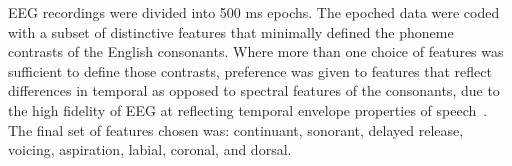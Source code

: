 EEG recordings were divided into 500 ms epochs.
The epoched data were coded with a subset of distinctive features
that minimally defined the phoneme contrasts of the English consonants.
Where more than one choice of features was sufficient to define those
contrasts, preference was given to features that reflect differences
in temporal as opposed to spectral features of the consonants, due to
the high fidelity of EEG at reflecting temporal envelope properties of 
speech~\cite{Liberto15}. The final set of features chosen was:
continuant, sonorant, delayed release, voicing, aspiration, labial,
coronal, and dorsal.

